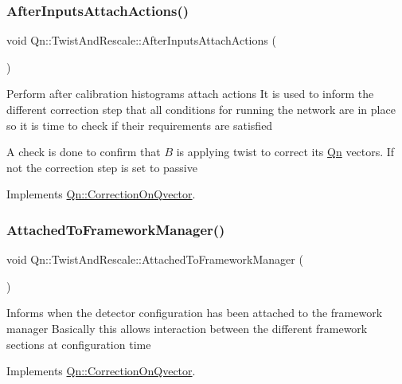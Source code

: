 \subsubsection{\texorpdfstring{After\+Inputs\+Attach\+Actions()}{AfterInputsAttachActions()}}
{\footnotesize\ttfamily void Qn\+::\+Twist\+And\+Rescale\+::\+After\+Inputs\+Attach\+Actions (\begin{DoxyParamCaption}{ }\end{DoxyParamCaption})\hspace{0.3cm}{\ttfamily [virtual]}}

Perform after calibration histograms attach actions It is used to inform the different correction step that all conditions for running the network are in place so it is time to check if their requirements are satisfied

A check is done to confirm that $ B $ is applying twist to correct its \mbox{\hyperlink{namespaceQn}{Qn}} vectors. If not the correction step is set to passive 

Implements \mbox{\hyperlink{classQn_1_1CorrectionOnQvector_afa95ec7804ade8097d92002e0ea05e44}{Qn\+::\+Correction\+On\+Qvector}}.

\mbox{\label{classQn_1_1TwistAndRescale_a75b3e7001fabda74adcf1441ffab1435}} 
\subsubsection{\texorpdfstring{Attached\+To\+Framework\+Manager()}{AttachedToFrameworkManager()}}
{\footnotesize\ttfamily void Qn\+::\+Twist\+And\+Rescale\+::\+Attached\+To\+Framework\+Manager (\begin{DoxyParamCaption}{ }\end{DoxyParamCaption})\hspace{0.3cm}{\ttfamily [virtual]}}

Informs when the detector configuration has been attached to the framework manager Basically this allows interaction between the different framework sections at configuration time 

Implements \mbox{\hyperlink{classQn_1_1CorrectionOnQvector_ad2d37eb35973c854c7ffa3560a97d510}{Qn\+::\+Correction\+On\+Qvector}}.

